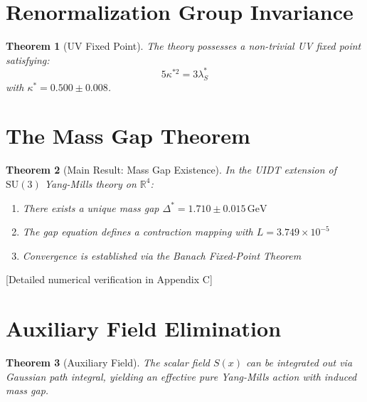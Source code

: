 \documentclass[11pt,a4paper]{article}
\newcommand{\R}{\mathbb{R}}
\theoremstyle{plain}
\newtheorem{theorem}{Theorem}[section]
\theoremstyle{definition}
\begin{document}
\section{Renormalization Group Invariance}
\label{sec:rg}

\begin{theorem}[UV Fixed Point]
\label{thm:fixed_point}
The theory possesses a non-trivial UV fixed point satisfying:
\begin{equation}
5\kappa^{*2} = 3\lambda_S^*
\end{equation}
with $\kappa^* = 0.500 \pm 0.008$.
\end{theorem}

\section{The Mass Gap Theorem}
\label{sec:massgap}

\begin{theorem}[Main Result: Mass Gap Existence]
\label{thm:main}
In the UIDT extension of $\mathrm{SU}(3)$ Yang-Mills theory on $\R^4$:
\begin{enumerate}[label=(\roman*)]
\item There exists a unique mass gap $\Delta^* = 1.710 \pm 0.015\,\mathrm{GeV}$
\item The gap equation defines a contraction mapping with $L = 3.749 \times 10^{-5}$
\item Convergence is established via the Banach Fixed-Point Theorem
\end{enumerate}
\end{theorem}

[Detailed numerical verification in Appendix C]

\section{Auxiliary Field Elimination}
\label{sec:auxiliary}

\begin{theorem}[Auxiliary Field]
\label{thm:auxiliary}
The scalar field $S(x)$ can be integrated out via Gaussian path integral, 
yielding an effective pure Yang-Mills action with induced mass gap.
\end{theorem}
\end{document}
